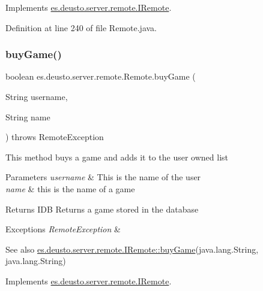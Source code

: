 Implements \hyperlink{interfacees_1_1deusto_1_1server_1_1remote_1_1_i_remote_a991909db4d26d5be67bb3e0bcb501c7e}{es.\+deusto.\+server.\+remote.\+I\+Remote}.



Definition at line 240 of file Remote.\+java.

\mbox{\label{classes_1_1deusto_1_1server_1_1remote_1_1_remote_ad9f8ad426b1162504b7b39eb1c86d2a3}} 
\subsubsection{\texorpdfstring{buy\+Game()}{buyGame()}}
{\footnotesize\ttfamily boolean es.\+deusto.\+server.\+remote.\+Remote.\+buy\+Game (\begin{DoxyParamCaption}\item[{String}]{username,  }\item[{String}]{name }\end{DoxyParamCaption}) throws Remote\+Exception}

This method buys a game and adds it to the user owned list 
\begin{DoxyParams}{Parameters}
{\em username} & This is the name of the user \\
\hline
{\em name} & this is the name of a game \\
\hline
\end{DoxyParams}
\begin{DoxyReturn}{Returns}
I\+DB Returns a game stored in the database 
\end{DoxyReturn}

\begin{DoxyExceptions}{Exceptions}
{\em Remote\+Exception} & \\
\hline
\end{DoxyExceptions}
\begin{DoxySeeAlso}{See also}
\hyperlink{interfacees_1_1deusto_1_1server_1_1remote_1_1_i_remote_ad2e6ee616bdc780b4057e63bf2ae8be7}{es.\+deusto.\+server.\+remote.\+I\+Remote\+::buy\+Game}(java.\+lang.\+String, java.\+lang.\+String) 
\end{DoxySeeAlso}


Implements \hyperlink{interfacees_1_1deusto_1_1server_1_1remote_1_1_i_remote_ad2e6ee616bdc780b4057e63bf2ae8be7}{es.\+deusto.\+server.\+remote.\+I\+Remote}.



